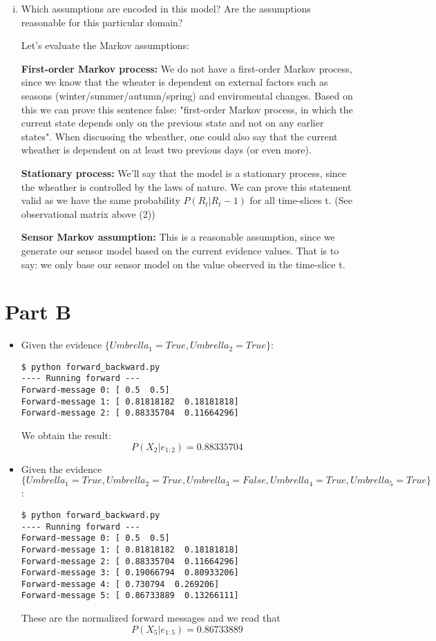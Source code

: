 \documentclass{article}
\begin{document}
\begin{enumerate}[(i)]
\item Which assumptions are encoded in this model? Are the assumptions reasonable for this particular domain?

Let's evaluate the Markov assumptions:

{\bf First-order Markov process:} We do not have a first-order Markov process, since we know that the wheater
is dependent on external factors such as seasons (winter/summer/autumn/spring) and enviromental changes.
Based on this we can prove this sentence false: "first-order Markov process, in which the current state depends
only on the previous state and not on any earlier states". When discussing the wheather, one could also say that
the current wheather is dependent on at least two previous days (or even more).

{\bf Stationary process:} We'll say that the model is a stationary process, since the wheather is controlled
by the laws of nature. We can prove this statement valid as we have the same probability $P(R_t|R_t-1)$ for 
all time-slices t. (See observational matrix above (2))

{\bf Sensor Markov assumption:} This is a reasonable assumption, since we generate our sensor model based on
the current evidence values. That is to say: we only base our sensor model on the value observed in the 
time-slice t.

\end{enumerate}

\section*{Part B}

\begin{itemize}

\item Given the evidence $\{ Umbrella_1 = True, Umbrella_2 = True \}$:
\begin{verbatim}
$ python forward_backward.py
---- Running forward ---
Forward-message 0: [ 0.5  0.5]
Forward-message 1: [ 0.81818182  0.18181818]
Forward-message 2: [ 0.88335704  0.11664296]
\end{verbatim}

We obtain the result:
\begin{equation}
P(X_2|e_{1:2}) = 0.88335704
\end{equation}

\item Given the evidence $\{ Umbrella_1 = True, Umbrella_2 = True, Umbrella_3 = False, Umbrella_4 = True, Umbrella_5 = True \}$:
\begin{verbatim}
$ python forward_backward.py
---- Running forward ---
Forward-message 0: [ 0.5  0.5]
Forward-message 1: [ 0.81818182  0.18181818]
Forward-message 2: [ 0.88335704  0.11664296]
Forward-message 3: [ 0.19066794  0.80933206]
Forward-message 4: [ 0.730794  0.269206]
Forward-message 5: [ 0.86733889  0.13266111]
\end{verbatim}
These are the normalized forward messages and we read that
\begin{equation}
P(X_5|e_{1:5}) = 0.86733889
\end{equation}
\end{itemize}
\end{document}

